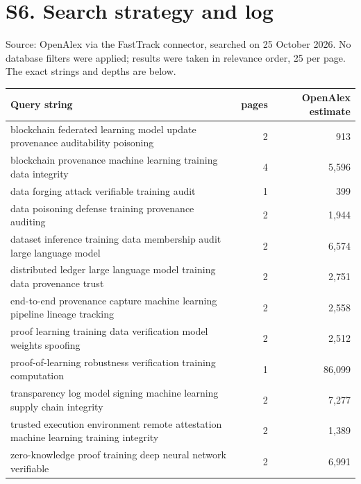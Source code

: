 \documentclass[10pt,a4paper]{article}
\begin{document}
\section{S6. Search strategy and log}
Source: OpenAlex via the FastTrack connector, searched on 25 October 2026. No database filters were applied; results were taken in relevance order, 25 per page. The exact strings and depths are below.
\par\small\begin{longtable}{p{10cm}rr}\toprule Query string & pages & OpenAlex estimate\\\midrule
blockchain federated learning model update provenance auditability poisoning & 2 & 913\\
blockchain provenance machine learning training data integrity & 4 & 5,596\\
data forging attack verifiable training audit & 1 & 399\\
data poisoning defense training provenance auditing & 2 & 1,944\\
dataset inference training data membership audit large language model & 2 & 6,574\\
distributed ledger large language model training data provenance trust & 2 & 2,751\\
end-to-end provenance capture machine learning pipeline lineage tracking & 2 & 2,558\\
proof learning training data verification model weights spoofing & 2 & 2,512\\
proof-of-learning robustness verification training computation & 1 & 86,099\\
transparency log model signing machine learning supply chain integrity & 2 & 7,277\\
trusted execution environment remote attestation machine learning training integrity & 2 & 1,389\\
zero-knowledge proof training deep neural network verifiable & 2 & 6,991\\
\bottomrule\end{longtable}\normalsize
\end{document}
